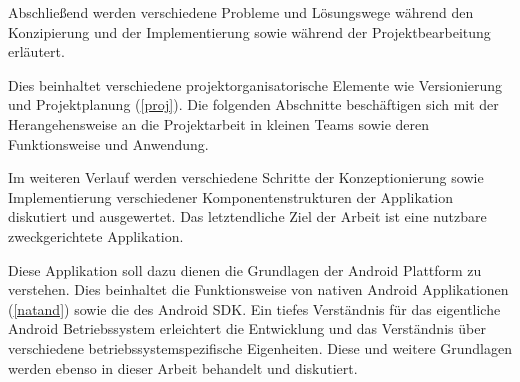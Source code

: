 Abschließend werden verschiedene Probleme und Lösungswege während den Konzipierung und der Implementierung sowie während der Projektbearbeitung erläutert.

Dies beinhaltet verschiedene projektorganisatorische Elemente wie Versionierung und Projektplanung (\ref{proj}). Die folgenden Abschnitte beschäftigen sich mit der Herangehensweise an die Projektarbeit in kleinen Teams sowie deren Funktionsweise und Anwendung.

Im weiteren Verlauf werden verschiedene Schritte der Konzeptionierung sowie Implementierung verschiedener Komponentenstrukturen der Applikation diskutiert und ausgewertet. Das letztendliche Ziel der Arbeit ist eine nutzbare zweckgerichtete Applikation.

Diese Applikation soll dazu dienen die Grundlagen der Android Plattform zu verstehen. Dies beinhaltet die Funktionsweise von nativen Android Applikationen (\ref{natand}) sowie die des Android SDK. Ein tiefes Verständnis für das eigentliche Android Betriebssystem erleichtert die Entwicklung und das Verständnis über verschiedene betriebssystemspezifische Eigenheiten. Diese und weitere Grundlagen werden ebenso in dieser Arbeit behandelt und diskutiert.